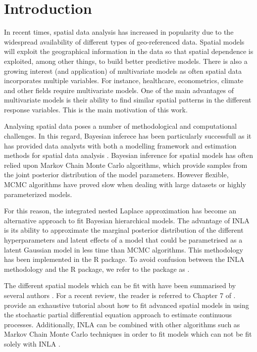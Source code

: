 \section{Introduction}
\label{Introduction}

\medskip
In recent times, spatial data analysis has increased in popularity due to the
widespread availability of different types of geo-referenced data. Spatial
models will exploit the geographical information in the data so that spatial
dependence is exploited, among other things, to build better predictive models.
There is also a growing interest (and application) of multivariate models as
often spatial data incorporates multiple variables.  For instance, healthcare,
econometrics, climate and other fields require multivariate models. One of the
main advantages of multivariate models is their ability to find similar spatial
patterns in the different response variables. This is the main motivation of this work.

\medskip
Analysing spatial data poses a number of methodological and computational
challenges. In this regard, Bayesian inferece has been particularly successfull as it has provided data analysts with both a modelling framework and estimation methods
for spatial data analysis \citep[see, for example, ][]{banerjee2014hierarchical}. Bayesian inference for spatial models has often relied upon Markov Chain Monte Carlo \citep[MCMC, ][]{MCMC} algorithms, which provide samples from the 
joint posterior distribution of the model parameters. However flexible, MCMC
algorithms have proved slow when dealing with large datasets or highly parameterized models.

\medskip
For this reason, the integrated nested Laplace approximation \citep[INLA, ][]{INLA} has become an alternative approach to fit Bayesian hierarchical models. The advantage of INLA is its ability to approximate the marginal posterior distribution of the different hyperparameters and latent effects of a model that could be parametrised as a latent Gaussian model \citep{rueheld:2005} in less time than MCMC algorithms. This methodology has been implemented in the  R package. To avoid confusion between the INLA methodology and the  R package, we refer to the package as  \citep{RINLA}. 

\medskip
The different spatial models which can be fit with  have been summarised by several authors
\citep{LindgrenRue2015, BlangiardoCameletti, Bakkaetal:2018}. For a recent review, the reader is referred to Chapter 7 of \citet{gomez2020bayesian}. \citet{Krainskietal:2019} provide an exhaustive tutorial about how to fit advanced spatial models in  using the stochastic partial differential equation approach \citep[SPDE, ][]{SPDE} to estimate continuous processes. Additionally, INLA can be combined with other algorithms such as Markov Chain Monte Carlo \citep[MCMC, ][]{MCMC} techniques in order to fit models which can not be fit solely with INLA \citep{GomezRubioPalmiPerales:2018}.

